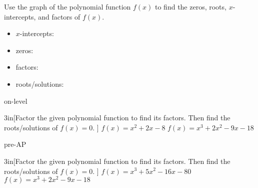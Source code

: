 \begin{myProblemsWithContent}{1}{%
    Use the graph of the polynomial function $f(x)$ to find the zeros, roots, $x$-intercepts, and factors 
    of $f(x)$.
    }
    \begin{minipage}{0.3\textwidth}
        \begin{center}
        \end{center}
    \end{minipage}

    \tcblower

    \begin{itemize}
        \item $x$-intercepts:\quad \underline{\hspace{3in}}
        \item zeros:\quad \underline{\hspace{3in}}
        \item factors:\quad \underline{\hspace{3in}}
        \item roots/solutions:\quad \underline{\hspace{3in}}
    \end{itemize}
\end{myProblemsWithContent}

\begin{taggedblock}{on-level}
    \begin{my2Problems}{3in}[Factor the given polynomial function to find its factors. Then find the roots/solutions of $f(x)=0$. ]
        {
            $f(x) = x^2 + 2x - 8$
        }
        {
            $f(x) = x^3 + 2x^2 - 9x - 18$
        }
\end{my2Problems}
\end{taggedblock}
\begin{taggedblock}{pre-AP}
    \begin{my2Problems}{3in}[Factor the given polynomial function to find its factors. Then find the roots/solutions of $f(x)=0$. ]
        {
            $f(x) = x^3 + 5x^2 - 16x - 80$
        }
        {
            $f(x) = x^3 + 2x^2 - 9x - 18$
        }
    \end{my2Problems}
\end{taggedblock}